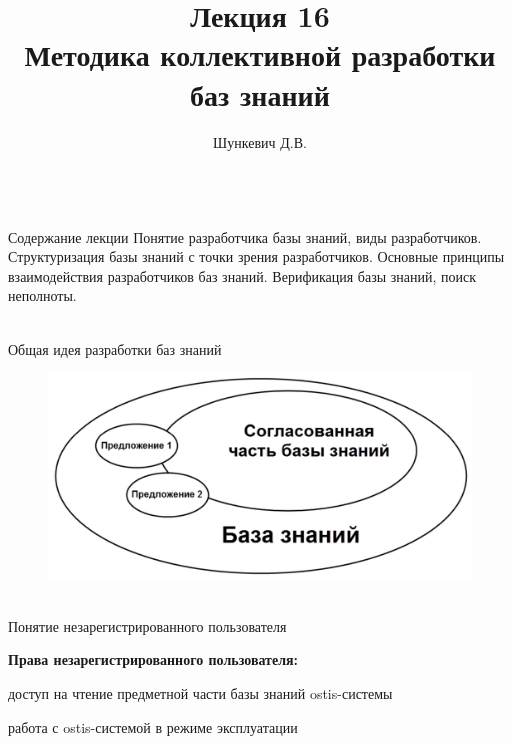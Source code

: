 \title{Лекция 16\\Методика коллективной разработки баз знаний}
\author[]{Шункевич Д.В.}

\begin{frame}
	\titlepage
\end{frame}

\begin{frame}{\\Содержание лекции}
	\topline
	\justifying
	Понятие разработчика базы знаний, виды разработчиков. Структуризация базы знаний с точки зрения разработчиков. Основные принципы взаимодействия разработчиков баз знаний. Верификация базы знаний, поиск неполноты.
\end{frame}


\begin{frame}{\\Общая идея разработки баз знаний}
	\topline
	\justifying
	\vspace{10mm}
	\begin{SCn}
		\begin{figure}[H]
			\includegraphics[scale=0.5]{./figures/sd_kb_develop_methods/kb_develop_idea.png}
		\end{figure}
	\end{SCn}
\end{frame}

\begin{frame}{\\Понятие незарегистрированного пользователя}
	\topline
	\justifying
	\begin{SCn}
		\vspace{5mm}
		
		\textbf{Права незарегистрированного пользователя:}
		\begin{textitemize}
			\item{доступ на чтение предметной части базы знаний ostis-системы}
			\item{работа	с ostis-системой в режиме эксплуатации}
		\end{textitemize}
	\end{SCn}
\end{frame}

